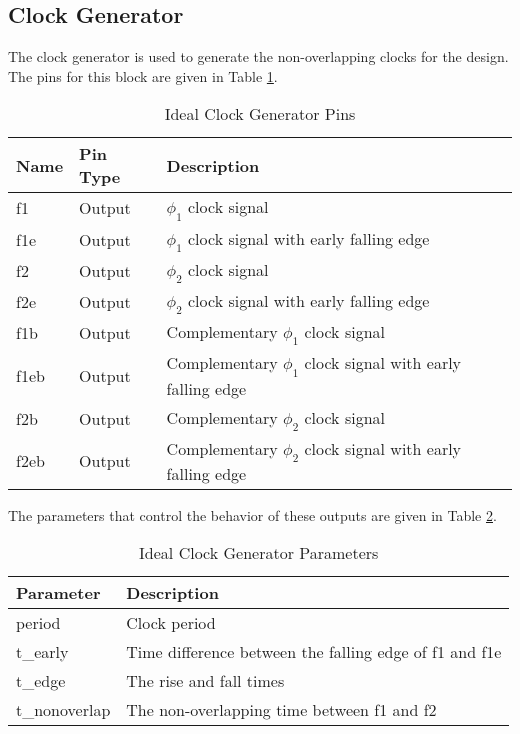 \subsection{Clock Generator}
The clock generator is used to generate the non-overlapping clocks for the design. The pins for this block are given in Table \ref{tab:clkgenpins}.
\begin{table}[htbp]
\begin{center}
\begin{tabular}{|l|l|l|}
\hline
Name & Pin Type & Description \\ \hline
f1 & Output & $\phi_{1}$ clock signal \\ \hline
f1e & Output & $\phi_{1}$ clock signal with early falling edge \\ \hline
f2 & Output & $\phi_{2}$ clock signal \\ \hline
f2e & Output & $\phi_{2}$ clock signal with early falling edge \\ \hline
f1b & Output & Complementary $\phi_{1}$ clock signal \\ \hline
f1eb & Output & Complementary $\phi_{1}$ clock signal with early falling edge \\ \hline
f2b & Output & Complementary $\phi_{2}$ clock signal \\ \hline
f2eb & Output & Complementary $\phi_{2}$ clock signal with early falling edge \\ \hline
\end{tabular}
\end{center}
\caption{Ideal Clock Generator Pins}
\label{tab:clkgenpins}
\end{table}
The parameters that control the behavior of these outputs are given in Table \ref{tab:clkgenparams}.
\begin{table}[htbp]
\begin{center}
\begin{tabular}{|l|l|}
\hline
Parameter & Description \\ \hline
period & Clock period \\ \hline
t\_early & Time difference between the falling edge of f1 and f1e \\ \hline
t\_edge & The rise and fall times \\ \hline
t\_nonoverlap & The non-overlapping time between f1 and f2 \\ \hline
\end{tabular}
\end{center}
\caption{Ideal Clock Generator Parameters}
\label{tab:clkgenparams}
\end{table}
